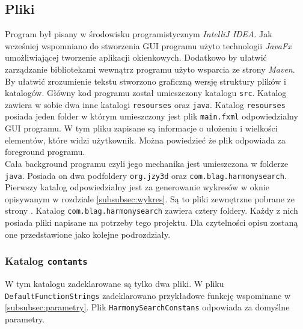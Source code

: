 \documentclass[10pt, a4paper]{article}
\begin{document}
\subsection{Pliki}
\label{subsec:pliki}
Program był pisany w środowisku programistycznym {\em IntelliJ IDEA}. Jak wcześniej wspomniano do stworzenia GUI programu użyto technologii {\em JavaFx} umożliwiającej tworzenie aplikacji okienkowych. Dodatkowo by ułatwić zarządzanie bibliotekami wewnątrz programu użyto wsparcia ze strony {\em Maven}. By ułatwić zrozumienie tekstu stworzono graficzną wersję struktury plików i katalogów. Główny kod programu został umieszczony katalogu {\tt src}. Katalog zawiera w sobie dwa inne katalogi {\tt resourses} oraz {\tt java}. Katalog {\tt resourses} posiada jeden folder w którym umieszczony jest plik {\tt main.fxml} odpowiedzialny GUI programu. W tym pliku zapisane są informacje o ułożeniu i wielkości elementów, które widzi użytkownik. Można powiedzieć że plik odpowiada za foreground programu. \\
Cała background programu czyli jego mechanika jest umieszczona w folderze {\tt java}. Posiada on dwa podfoldery {\tt org.jzy3d} oraz {\tt com.blag.harmonysearch}. Pierwszy katalog odpowiedzialny jest za generowanie wykresów w oknie opisywanym w rozdziale \ref{subsubsec:wykres}. Są to pliki zewnętrzne pobrane ze strony \cite{bib:jzy3d}. Katalog {\tt com.blag.harmonysearch} zawiera cztery foldery. Każdy z nich posiada pliki napisane na potrzeby tego projektu. Dla czytelności opisu zostaną one przedstawione jako kolejne podrozdziały. 

\subsubsection{Katalog {\tt contants}}
\label{subsubsec:contants}
W tym katalogu zadeklarowane są tylko dwa pliki. W pliku {\tt DefaultFunctionStrings} zadeklarowano przykładowe funkcję wspominane w \ref{subsubsec:parametry}. Plik {\tt HarmonySearchConstans} odpowiada za domyślne parametry. 
\end{document}
